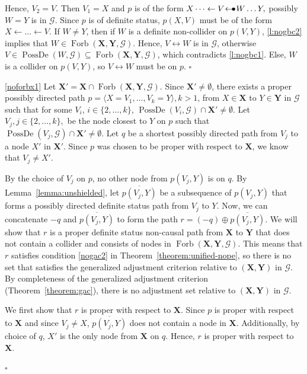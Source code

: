 \documentclass[11pt,a4paper]{article}
\newenvironment{proofof}[1][]{\begin{trivlist}
   \item[\hskip \labelsep {\bfseries Proof of #1.}]}{\hfill{}$\square$\end{trivlist}}
\DeclareMathOperator{\PossDe}{PossDe}
\DeclareMathOperator{\Forbi}{Forb}
\newcommand{\g}[1][G]{\mathcal{#1}}
\newcommand{\fb}[2][X,Y]{\Forbi(\mathbf{#1},#2)}%
\newcommand{\arrowbullet}{
  \setlength{\unitlength}{1mm}
  \begin{picture}(5,1)(0,0)
    \put(0.2,0){$\leftarrow$}
    \put(3,0){$\bullet$}
  \end{picture}
}
\begin{document}
\begin{proofof}[Lemma~\ref{lemma:no gbc path}]
Hence, $V_2 = V$. Then $V_1 =X$ and $p$ is of the form $X \dots \leftarrow V \arrowbullet W \dots Y,$ possibly $W =Y$ is in $\g$. Since $p$ is of definite status, $p(X,V)$ must be of the form $X \leftarrow \dots \leftarrow V$. If $W \neq Y$, then if $W$ is a definite non-collider on $p(V,Y)$, \ref{l:nogbc2} implies that $W \in \fb{\g}$. Hence, $V \leftrightarrow W$ is in $\g$, otherwise $V \in \PossDe(W,\g) \subseteq \fb{\g}$, which contradicts \ref{l:nogbc1}. Else, $W$ is a collider on $p(V,Y)$, so $V \leftrightarrow W$ must be on $p$.
\end{proofof}

\begin{proofof}[Corollary~\ref{cor:noforbx}]
\ref{noforbx1}
Let $\mathbf{X'} = \mathbf{X} \cap \fb{\g}$. Since $\mathbf{X'} \neq \emptyset$, there exists a proper possibly directed path
$p = \langle X = V_1,\dots, V_k = Y\rangle, k >1$, from $X \in \mathbf{X}$ to $Y \in \mathbf{Y}$ in $\g$ such that for some $V_i$, $i \in \{2,\dots, k\}$, $\PossDe(V_i,\g) \cap \mathbf{X'} \neq \emptyset$. Let $V_j, j \in \{2,\dots, k\},$ be the node closest to $Y$ on $p$ such that $\PossDe(V_j,\g) \cap \mathbf{X'} \neq \emptyset$. 
Let $q$ be a shortest possibly directed path from $V_j$ to a node $X'$ in $\mathbf{X'}$. Since $p$ was chosen to be proper with respect to $\mathbf{X}$, we know that $V_j \neq X'$.  

By the choice of $V_j$ on $p$, no other node from $p(V_j,Y)$ is on $q$. By Lemma~\ref{lemma:unshielded}, let $\overline{p(V_j,Y)}$ be a subsequence of $p(V_j,Y)$ that forms a possibly directed definite status path from $V_j$ to $Y$.
Now, we can concatenate $-q$ and $\overline{p(V_j,Y)}$ to form the path $r= (-q) \oplus \overline{p(V_j,Y)}$. We will show that $r$ is a proper definite status non-causal path from $\mathbf{X}$ to $\mathbf{Y}$ that does not contain a collider and consists of nodes in $\fb{\g}$. This means that $r$ satisfies condition \ref{nogac2} in Theorem~\ref{theorem:unified-nope}, so there is no set that satisfies the generalized adjustment criterion relative to $(\mathbf{X,Y})$ in $\g$. By completeness of the generalized adjustment criterion (Theorem~\ref{theorem:gac}), there is no adjustment set relative to $(\mathbf{X,Y})$ in $\g$. 

We first show that $r$ is proper with respect to $\mathbf{X}$. Since $p$ is proper with respect to $\mathbf{X}$ and since $V_j \neq X$, $\overline{p(V_j,Y)}$ does not contain a node in $\mathbf{X}$. Additionally, by choice of $q$, $X'$ is the only node from $\mathbf{X}$ on $q$. Hence, $r$ is proper with respect to $\mathbf{X}$.


\end{proofof}
\end{document}
